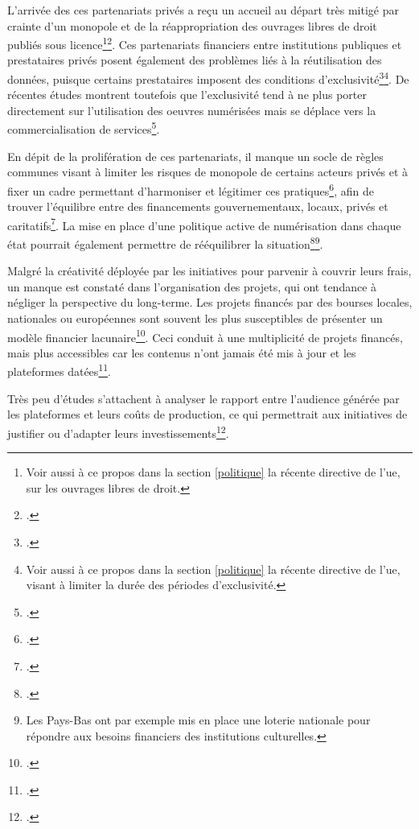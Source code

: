 L'arrivée des ces partenariats privés a reçu un accueil au départ très mitigé par crainte d'un monopole et de la réappropriation des ouvrages libres de droit publiés sous licence\footnote{Voir aussi à ce propos dans la section \ref{politique} la récente directive de l'\gls{ue}, sur les ouvrages libres de droit.}\footcite{association_pour_le_patrimoine_naturel_et_culturel_du_canton_de_vaud_patrimoine_2012}. Ces partenariats financiers entre institutions publiques et prestataires privés posent également des problèmes liés à la réutilisation des données, puisque certains prestataires imposent des conditions d'exclusivité\footcite{dufrene_numerisation_2013}\footnote{Voir aussi à ce propos dans la section \ref{politique} la récente directive de l'\gls{ue}, visant à limiter la durée des périodes d'exclusivité.}. De récentes études montrent toutefois que l'exclusivité tend à ne plus porter directement sur l'utilisation des oeuvres numérisées mais se déplace vers la commercialisation de services\footcite{maurel_quel_2017}.

En dépit de la prolifération de ces partenariats, il manque un socle de règles communes visant à limiter les risques de monopole de certains acteurs privés et à fixer un cadre permettant d'harmoniser et légitimer ces pratiques\footcite{dufrene_numerisation_2013}, afin de trouver l'équilibre entre des financements gouvernementaux, locaux, privés et caritatifs\footcite{yeates_collaborative_2006}. La mise en place d'une politique active de numérisation dans chaque état pourrait également permettre de rééquilibrer la situation\footcite{maurel_quel_2017}\footnote{Les Pays-Bas ont par exemple mis en place une loterie nationale pour répondre aux besoins financiers des institutions culturelles.}.

Malgré la créativité déployée par les initiatives pour parvenir à couvrir leurs frais, un manque est constaté dans l'organisation des projets, qui ont tendance à négliger la perspective du long-terme. Les projets financés par des bourses locales, nationales ou européennes sont souvent les plus susceptibles de présenter un modèle financier lacunaire\footcite{lampert_ramping_2018}. Ceci conduit à une multiplicité de projets financés, mais plus accessibles car les contenus n'ont jamais été mis à jour et les plateformes datées\footcite{eschenfelder_nine_2019}. 

Très peu d'études s'attachent à analyser le rapport entre l'audience générée par les plateformes et leurs coûts de production, ce qui permettrait aux initiatives de justifier ou d'adapter leurs investissements\footcite{moatti_bibliotheque_2012}.
